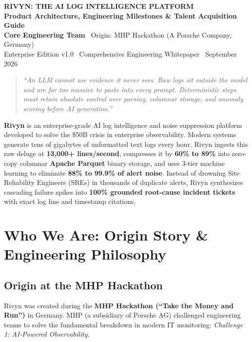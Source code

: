 \documentclass[11pt,a4paper]{article}
\begin{document}
\begin{center}
    {\Huge \textbf{\color{rivyndark}RIVYN: THE AI LOG INTELLIGENCE PLATFORM}}\\[8pt]
    {\Large \textbf{\color{rivyncyan}Product Architecture, Engineering Milestones \& Talent Acquisition Guide}}\\[10pt]
    {\normalsize \color{rivyngray}\textbf{Core Engineering Team} \textbar\ Origin: MHP Hackathon (A Porsche Company, Germany)}\\[2pt]
    {\small \color{rivyngray}Enterprise Edition v1.0 \textbar\ Comprehensive Engineering Whitepaper \textbar\ September 2026}
\end{center}

\vspace{8pt}
\begin{quote}
\centering \itshape
``An LLM cannot use evidence it never sees. Raw logs sit outside the model and are far too massive to paste into every prompt. Deterministic steps must retain absolute control over parsing, columnar storage, and anomaly scoring before AI generation.''
\end{quote}
\vspace{10pt}

\begin{calloutbox}
\textbf{Rivyn} is an enterprise-grade AI log intelligence and noise suppression platform developed to solve the \$50B crisis in enterprise observability. Modern systems generate tens of gigabytes of unformatted text logs every hour. Rivyn ingests this raw deluge at \textbf{13,000+ lines/second}, compresses it by \textbf{60\% to 89\%} into zero-copy columnar \textbf{Apache Parquet} binary storage, and uses 3-tier machine learning to eliminate \textbf{88\% to 99.9\% of alert noise}. Instead of drowning Site Reliability Engineers (SREs) in thousands of duplicate alerts, Rivyn synthesizes cascading failure spikes into \textbf{100\% grounded root-cause incident tickets} with exact log line and timestamp citations.
\end{calloutbox}

\section{Who We Are: Origin Story \& Engineering Philosophy}

\subsection{Origin at the MHP Hackathon}
Rivyn was created during the \textbf{MHP Hackathon (``Take the Money and Run'')} in Germany. MHP (a subsidiary of Porsche AG) challenged engineering teams to solve the fundamental breakdown in modern IT monitoring: \textit{Challenge 1: AI-Powered Observability}.
\end{document}
